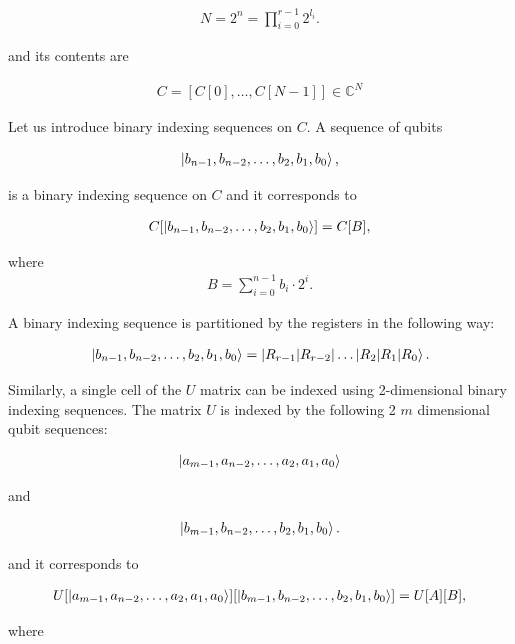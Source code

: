 \begin{align*}
N = 2^n = \prod\limits_{i=0}^{r-1} 2^{l_i}.
\end{align*}

and its contents are

\begin{align*}
C = [C[0],\dots{},C[N-1]] \in{} \mathds{C}^N
\end{align*}

Let us introduce binary indexing sequences on $C$. A sequence of qubits

\begin{align*}
\ket{b_{n-1},b_{n-2},\dots{},b_2,b_1,b_0},
\end{align*}

is a binary indexing sequence on $C$ and it corresponds to

\begin{align*}
C[\ket{b_{n-1},b_{n-2},\dots{},b_2,b_1,b_0}] = C[B],
\end{align*}

where
\begin{align*}
B = \sum\limits_{i=0}^{n-1}b_i\cdot{}2^{i}.
\end{align*}

A binary indexing sequence is partitioned by the registers in the following way:

\begin{align*}
\ket{b_{n-1},b_{n-2},\dots{},b_2,b_1,b_0} = \ket{R_{r-1} | R_{r-2} | \dots{} | R_2 | R_1 | R_0}.
\end{align*}

Similarly, a single cell of the $U$ matrix can be indexed using 2-dimensional binary indexing sequences. The matrix $U$ is indexed by the following 2 $m$ dimensional qubit sequences:

\begin{align*}
\ket{a_{m-1},a_{n-2},\dots{},a_2,a_1,a_0}
\end{align*}

and

\begin{align*}
\ket{b_{m-1},b_{n-2},\dots{},b_2,b_1,b_0}.
\end{align*}

and it corresponds to

\begin{align*}
U[\ket{a_{m-1},a_{n-2},\dots{},a_2,a_1,a_0}][\ket{b_{m-1},b_{n-2},\dots{},b_2,b_1,b_0}] = U[A][B],
\end{align*}

where

